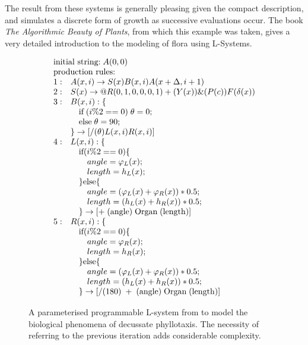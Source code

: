 The result from these systems is generally pleasing given the compact description, and simulates a discrete form of growth as successive evaluations occur. The book \emph{The Algorithmic Beauty of Plants}\cite{ABP}, from which this example was taken, gives a very detailed introduction to the modeling of flora using L-Systems.

\begin{figure}
\[
\begin{array} { l l }
\multicolumn{2}{l}{$initial string$: A(0,0)}\\
\multicolumn{2}{l}{$production rules$ :}\\

1: & A(x,i) \rightarrow S(x)B(x,i)A(x+\Delta,i+1)\\
2: & S(x) \rightarrow @R(0,1,0,0,0,1)+(Y(x))\&(P(c))F(\delta(x))\\
3: & B(x,i): \{\\
   & \quad $if$ \; (i \% 2 == 0) \; \theta = 0;\\
   & \quad $else$ \; \theta = 90;\\
   & \} \rightarrow [/(\theta)L(x,i)R(x,i)]\\
4: & L(x,i) : \{\\
   &  \quad $if$ (i \% 2 == 0) \{\\
   &  \quad \quad angle = \varphi_L(x);\\
   &  \quad \quad length = h_L(x);\\
   &  \quad \} $else$ \{\\
   &  \quad \quad angle = (\varphi_L(x)+\varphi_R(x))*0.5;\\
   &  \quad \quad length = (h_L(x) + h_R(x)) * 0.5;\\
   &  \quad \} \rightarrow [+\;($angle$)\; $Organ$ \;($length$)]\\
5: & R(x,i):\{\\
   &  \quad $if$ (i \% 2 == 0) \{\\
   &  \quad \quad angle = \varphi_R(x);\\
   &  \quad \quad length = h_R(x);\\
   &  \quad \} $else$ \{\\
   &  \quad \quad angle = (\varphi_L(x)+\varphi_R(x))*0.5;\\
   &  \quad \quad length = (h_L(x) + h_R(x)) * 0.5;\\
   &  \quad \} \rightarrow [/(180)\;+\;($angle$)\; $Organ$ \;($length$)]\\
\end{array}
\]
\caption[An example of a complex L-system]{A parameterised programmable L-system from\cite{Anastacio09} to model the biological phenomena of decussate phyllotaxis. The necessity of referring to the previous iteration adds considerable complexity.}
\label{fig:notanlsystem}
\end{figure}

